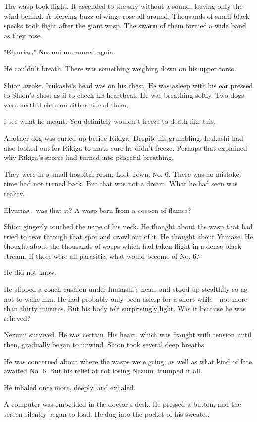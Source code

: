 The wasp took flight. It ascended to the sky without a sound, leaving
only the wind behind. A piercing buzz of wings rose all around.
Thousands of small black specks took flight after the giant wasp. The
swarm of them formed a wide band as they rose.

"Elyurias," Nezumi murmured again.

He couldn't breath. There was something weighing down on his upper
torso.

Shion awoke. Inukashi's head was on his chest. He was asleep with his
ear pressed to Shion's chest as if to check his heartbeat. He was
breathing softly. Two dogs were nestled close on either side of them.

I see what he meant. You definitely wouldn't freeze to death like this.

Another dog was curled up beside Rikiga. Despite his grumbling, Inukashi
had also looked out for Rikiga to make sure he didn't freeze. Perhaps
that explained why Rikiga's snores had turned into peaceful breathing.

They were in a small hospital room, Lost Town, No. 6. There was no
mistake: time had not turned back. But that was not a dream. What he had
seen was reality.

Elyurias―was that it? A wasp born from a cocoon of flames?

Shion gingerly touched the nape of his neck. He thought about the wasp
that had tried to tear through that spot and crawl out of it. He thought
about Yamase. He thought about the thousands of wasps which had taken
flight in a dense black stream. If those were all parasitic, what would
become of No. 6?

He did not know.

He slipped a couch cushion under Inukashi's head, and stood up
stealthily so as not to wake him. He had probably only been asleep for a
short while―not more than thirty minutes. But his body felt surprisingly
light. Was it because he was relieved?

Nezumi survived. He was certain. His heart, which was fraught with
tension until then, gradually began to unwind. Shion took several deep
breaths.

He was concerned about where the wasps were going, as well as what kind
of fate awaited No. 6. But his relief at not losing Nezumi trumped it
all.

He inhaled once more, deeply, and exhaled.

A computer was embedded in the doctor's desk. He pressed a button, and
the screen silently began to load. He dug into the pocket of his
sweater.

